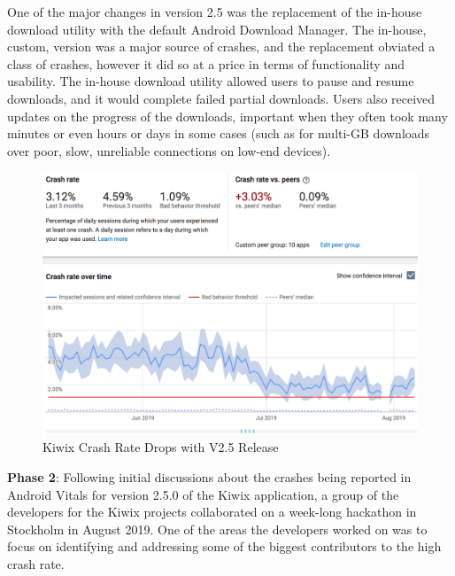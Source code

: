 One of the major changes in version 2.5 was the replacement of the in-house download utility with the default Android Download Manager\cite{kiwix_release_2_5_0}. The in-house, custom, version was a major source of crashes, and the replacement obviated a class of crashes, however it did so at a price in terms of functionality and usability. The in-house download utility allowed users to pause and resume downloads, and it would complete failed partial downloads. Users also received updates on the progress of the downloads, important when they often took many minutes or even hours or days in some cases (such as for multi-GB downloads over poor, slow, unreliable connections on low-end devices).

\begin{figure}[htbp!]
    \centering
    \includegraphics[width=\textwidth]{images/android-vitals-screenshots/kiwix-crash-rate-drops-with-v2_5.png}
    \caption{Kiwix Crash Rate Drops with V2.5 Release}
    \label{fig:kiwix_crash_rate_drops_v2_5}
\end{figure}

\textbf{Phase 2}: Following initial discussions about the crashes being reported in Android Vitals for version 2.5.0 of the Kiwix application, a group of the developers for the Kiwix projects collaborated on a week-long hackathon in Stockholm in August 2019. One of the areas the developers worked on was to focus on identifying and addressing some of the biggest contributors to the high crash rate. 
%

